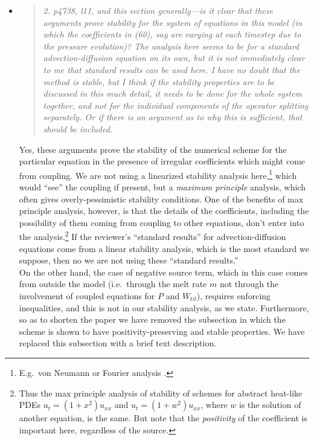 \documentclass[11pt,reqno]{amsart}
\newcommand{\reply}[2]{
\medskip\medskip
\item  \begin{quote}
\emph{#1}
\end{quote}

\medskip
\noindent #2}
\begin{document}
\begin{itemize}
\reply{2. p4738, l11, and this section generally---is it clear that these arguments prove
stability for the \emph{system} of equations in this model (in which the coefficients in (60),
say are varying at each timestep due to the pressure evolution)? The analysis
here seems to be for a standard advection-diffusion equation on its own, but it
is not immediately clear to me that standard results can be used here. I have
no doubt that the method is stable, but I think if the stability properties are to be
discussed in this much detail, it needs to be done for the whole system together,
and not for the individual components of the operator splitting separately. Or if
there is an argument as to why this is sufficient, that should be included.}
{Yes, these arguments prove the stability of the numerical scheme for the particular equation in the presence of irregular coefficients which might come from coupling.  We are not using a linearized stability analysis here,\footnote{E.g.~von Neumann or Fourier analysis \cite{MortonMayers}.} which would ``see'' the coupling if present, but a \emph{maximum principle} analysis, which often gives overly-pessimistic stability conditions.  One of the benefits of max principle analysis, however, is that the details of the coefficients, including the possibility of them coming from coupling to other equations, don't enter into the analysis.\footnote{Thus the max principle analysis of stability of schemes for abstract heat-like PDEs $u_t=(1+x^2)u_{xx}$ and $u_t=(1+w^2)u_{xx}$, where $w$ is the solution of another equation, is the same.  But note that the \emph{positivity} of the coefficient is important here, regardless of the source.}  If the reviewer's ``standard results'' for advection-diffusion equations come from a linear stability analysis, which is the most standard we suppose, then no we are not using these ``standard results.''\\
\indent On the other hand, the case of negative source term, which in this case comes from outside the model (i.e.~through the melt rate $m$ not through the involvement of coupled equations for $P$ and $W_{til}$), requires enforcing inequalities, and this is not in our stability analysis, as we state.  Furthermore, so as to shorten the paper we have removed the subsection in which the scheme is shown to have positivity-preserving and stable properties.  We have replaced this subsection with a brief text description.}


\end{itemize}
\end{document}
